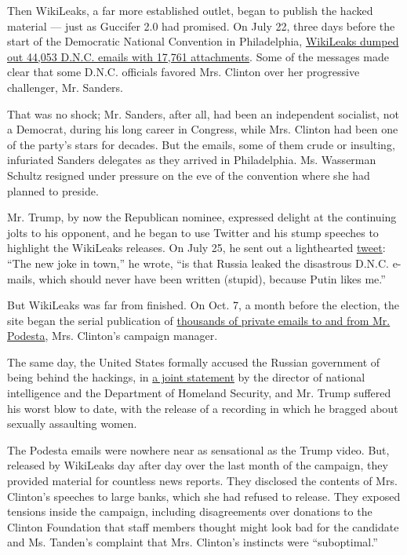 Then WikiLeaks, a far more established outlet, began to publish the
hacked material --- just as Guccifer 2.0 had promised. On July 22, three
days before the start of the Democratic National Convention in
Philadelphia, \href{https://wikileaks.org/dnc-emails/}{WikiLeaks dumped
out 44,053 D.N.C. emails with 17,761 attachments}. Some of the messages
made clear that some D.N.C. officials favored Mrs. Clinton over her
progressive challenger, Mr. Sanders.

That was no shock; Mr. Sanders, after all, had been an independent
socialist, not a Democrat, during his long career in Congress, while
Mrs. Clinton had been one of the party's stars for decades. But the
emails, some of them crude or insulting, infuriated Sanders delegates as
they arrived in Philadelphia. Ms. Wasserman Schultz resigned under
pressure on the eve of the convention where she had planned to preside.

Mr. Trump, by now the Republican nominee, expressed delight at the
continuing jolts to his opponent, and he began to use Twitter and his
stump speeches to highlight the WikiLeaks releases. On July 25, he sent
out a lighthearted
\href{https://twitter.com/realDonaldTrump/status/757538729170964481}{tweet}:
``The new joke in town,'' he wrote, ``is that Russia leaked the
disastrous D.N.C. e-mails, which should never have been written
(stupid), because Putin likes me.''

But WikiLeaks was far from finished. On Oct. 7, a month before the
election, the site began the serial publication of
\href{https://wikileaks.org/podesta-emails/}{thousands of private emails
to and from Mr. Podesta}, Mrs. Clinton's campaign manager.

The same day, the United States formally accused the Russian government
of being behind the hackings, in
\href{https://www.dhs.gov/news/2016/10/07/joint-statement-department-homeland-security-and-office-director-national}{a
joint statement} by the director of national intelligence and the
Department of Homeland Security, and Mr. Trump suffered his worst blow
to date, with the release of a recording in which he bragged about
sexually assaulting women.

The Podesta emails were nowhere near as sensational as the Trump video.
But, released by WikiLeaks day after day over the last month of the
campaign, they provided material for countless news reports. They
disclosed the contents of Mrs. Clinton's speeches to large banks, which
she had refused to release. They exposed tensions inside the campaign,
including disagreements over donations to the Clinton Foundation that
staff members thought might look bad for the candidate and Ms. Tanden's
complaint that Mrs. Clinton's instincts were ``suboptimal.''

